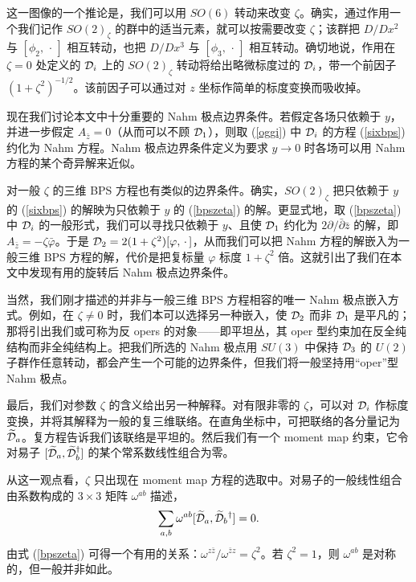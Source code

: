 这一图像的一个推论是，我们可以用 $SO(6)$ 转动来改变 $\zeta$。确实，通过作用一个我们记作 $SO(2)_\zeta$ 的群中的适当元素，就可以按需要改变 $\zeta$；该群把 $D/Dx^2$ 与 $[\phi_2,\,\cdot\,] $ 相互转动，也把 $D/Dx^3$ 与 $[\phi_3,\,\cdot\,]$ 相互转动。确切地说，作用在 $\zeta=0$ 处定义的 ${\mathcal D}_i$ 上的 $SO(2)_\zeta$ 转动将给出略微标度过的 ${\mathcal D}_i$，带一个前因子 $(1+\zeta^2)^{-1/2}$。该前因子可以通过对 $z$ 坐标作简单的标度变换而吸收掉。

现在我们讨论本文中十分重要的 Nahm 极点边界条件。若假定各场只依赖于 $y$，并进一步假定 $A_{\bar z}=0$（从而可以不顾 ${\mathcal D}_1$），则取 (\ref{oggi}) 中 ${\mathcal D}_i$ 的方程 (\ref{sixbps}) 约化为 Nahm 方程。Nahm 极点边界条件定义为要求 $y\to 0$ 时各场可以用 Nahm 方程的某个奇异解来近似。


对一般 $\zeta$ 的三维 BPS 方程也有类似的边界条件。确实，$SO(2)_\zeta$ 把只依赖于 $y$ 的 (\ref{sixbps}) 的解映为只依赖于 $y$ 的 (\ref{bpszeta}) 的解。更显式地，取 (\ref{bpszeta}) 中 ${\mathcal D}_i$ 的一般形式，我们可以寻找只依赖于 $y$、且使 ${\mathcal D}_1$ 约化为 $2\partial/\bar\partial\bar z$ 的解，即 $A_{\bar z} =- \zeta \bar \varphi$。于是 ${\mathcal D}_2 =  2(1 + \zeta^2) [\varphi,\,\cdot\,]$，从而我们可以把 Nahm 方程的解嵌入为一般三维 BPS 方程的解，代价是把复标量 $\varphi$ 标度 $1+ \zeta^2$ 倍。这就引出了我们在本文中发现有用的旋转后 Nahm 极点边界条件。


当然，我们刚才描述的并非与一般三维 BPS 方程相容的唯一 Nahm 极点嵌入方式。例如，在 $\zeta \neq 0$ 时，我们本可以选择另一种嵌入，使 ${\mathcal D}_2$ 而非 ${\mathcal D}_1$ 是平凡的；那将引出我们或可称为反 opers 的对象——即平坦丛，其 oper 型约束加在反全纯结构而非全纯结构上。把我们所选的 Nahm 极点用 $SU(3)$ 中保持 ${\mathcal D}_3$ 的 $U(2)$ 子群作任意转动，都会产生一个可能的边界条件，但我们将一般坚持用“oper”型 Nahm 极点。

最后，我们对参数 $\zeta$ 的含义给出另一种解释。对有限非零的 $\zeta$，可以对 ${\mathcal D}_i$ 作标度变换，并将其解释为一般的复三维联络。在直角坐标中，可把联络的各分量记为 $\widetilde {{\mathcal D}}_a$。复方程告诉我们该联络是平坦的。然后我们有一个 moment map 约束，它令对易子 $[\widetilde {{\mathcal D}}_a, \widetilde {{\mathcal D}}^\dagger_b]$ 的某个常系数线性组合为零。

从这一观点看，$\zeta$ 只出现在 moment map 方程的选取中。对易子的一般线性组合由系数构成的 $3 \times 3$ 矩阵 $\omega^{ab}$ 描述，
\begin{equation}\label{mct}  \sum_{a,b} \omega^{ab} [\widetilde {{\mathcal D}}_a,\widetilde {{\mathcal D}}_b{}^\dagger]=0.
\end{equation}
由式 (\ref{bpszeta}) 可得一个有用的关系：$\omega^{z \bar z}/\omega^{\bar z z}=\zeta^2$。若 $\zeta^2=1$，则 $\omega^{ab}$ 是对称的，但一般并非如此。

